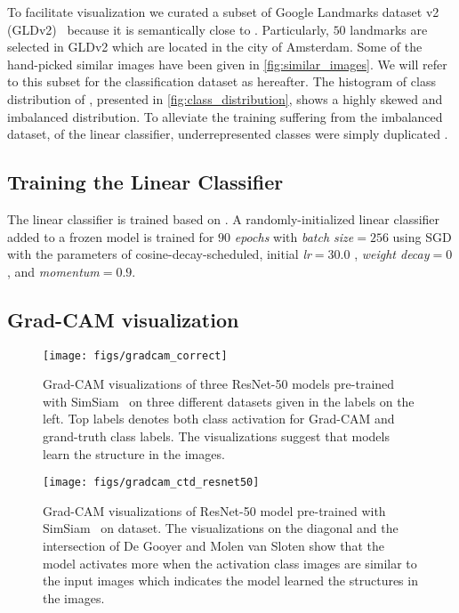 \documentclass[a4paper,conference]{IEEEtran}
\begin{document}
To facilitate visualization  we curated a subset of Google Landmarks dataset v2 (GLDv2)~\cite{weyand2020google} because it is semantically close to \amstertime. Particularly, $50$ landmarks are selected in GLDv2 which are located in the city of Amsterdam. Some of the hand-picked similar images have been given in \cref{fig:similar_images}. We will refer to this subset for the classification dataset as \textit{\amsterdam} hereafter. The histogram of class distribution of \amsterdam,  presented in  \cref{fig:class_distribution}, shows a highly skewed and imbalanced distribution. To alleviate the training suffering from the imbalanced dataset, of the linear classifier, underrepresented classes were simply duplicated \amsterdam.


\subsection{Training the Linear Classifier}
The linear classifier is trained based on \cite{chen2020simsiam}. A randomly-initialized linear classifier added to a frozen model is trained for $90$ {\textit{epochs}} with {\textit{batch size}}$=256$ using SGD  with the parameters of cosine-decay-scheduled, initial \textit{lr}$=30.0$ , \textit{weight decay}$=0$, and \textit{momentum}$=0.9$.  


\subsection{Grad-CAM visualization}

\begin{figure}[t]
\centering
\texttt{[image: figs/gradcam\_correct]}
\caption{Grad-CAM visualizations of three ResNet-50 models pre-trained with SimSiam~\cite{chen2020simsiam} on three different datasets given in the labels on the left. Top labels denotes both class activation for Grad-CAM and grand-truth class labels. The visualizations suggest that models learn the structure in the images.}
\label{fig:gradcam_simsiam}
\end{figure}

\begin{figure}[t]
\centering
\texttt{[image: figs/gradcam\_ctd\_resnet50]}
\caption{Grad-CAM visualizations of ResNet-50 model pre-trained with SimSiam~\cite{chen2020simsiam} on \amstertime dataset. The visualizations on the diagonal and the intersection of De Gooyer and Molen van Sloten show that the model activates more when the activation class images are similar to the input images which indicates the model learned the structures in the images.}
\label{fig:gradcam_amstertime}
\end{figure}
\end{document}
